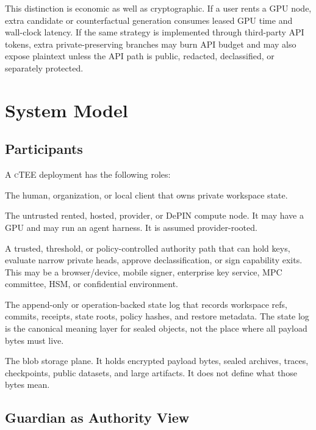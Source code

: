 \documentclass[11pt]{article}
\newcommand{\ctee}{\textnormal{\textsc{cTEE}}}
\newcommand{\roletext}[1]{\textnormal{\textsc{#1}}\xspace}
\newcommand{\node}{\ifmmode\mathsf{Node}\else\roletext{Node}\fi}
\newcommand{\guard}{\ifmmode\mathsf{Guardian}\else\roletext{Guardian}\fi}
\newcommand{\user}{\ifmmode\mathsf{User}\else\roletext{User}\fi}
\newcommand{\ag}{\ifmmode\mathsf{StateLog}\else\roletext{StateLog}\fi}
\newcommand{\store}{\ifmmode\mathsf{BlobStore}\else\roletext{BlobStore}\fi}
\begin{document}
This distinction is economic as well as cryptographic. If a user rents a GPU
node, extra candidate or counterfactual generation consumes leased GPU time and
wall-clock latency. If the same strategy is implemented through third-party API
tokens, extra private-preserving branches may burn API budget and may also
expose plaintext unless the API path is public, redacted, declassified, or
separately protected.

\section{System Model}

\subsection{Participants}

A \ctee{} deployment has the following roles:

\begin{description}[leftmargin=1.8em]
\item[\user.] The human, organization, or local client that owns private
workspace state.
\item[\node.] The untrusted rented, hosted, provider, or DePIN compute node. It
may have a GPU and may run an agent harness. It is assumed provider-rooted.
\item[\guard.] A trusted, threshold, or policy-controlled authority path that
can hold keys, evaluate narrow private heads, approve declassification, or sign
capability exits. This may be a browser/device, mobile signer, enterprise key
service, MPC committee, HSM, or confidential environment.
\item[\ag.] The append-only or operation-backed state log that records
workspace refs, commits, receipts, state roots, policy hashes, and restore
metadata. The state log is the canonical meaning layer for sealed objects,
not the place where all payload bytes must live.
\item[\store.] The blob storage plane. It holds encrypted payload bytes, sealed
archives, traces, checkpoints, public datasets, and large artifacts. It does
not define what those bytes mean.
\end{description}

\subsection{Guardian as Authority View}
\end{document}
